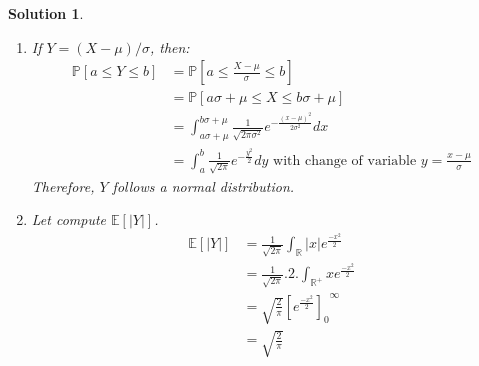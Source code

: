\documentclass{article}
\newcommand{\proba}[1]{\mathbb{P}[#1]}
\newcommand{\esperance}[1]{\mathbb{E}[#1]}
\newcommand{\R}{\mathbb{R}}
\newtheorem{solution}{Solution}
\begin{document}
\begin{solution}
  \begin{enumerate}
    \item If $Y=(X-\mu)/\sigma$, then:
          \begin{align*}
            \proba{a \leq Y \leq b} & = \proba{a \leq \frac{X-\mu}{\sigma} \leq b}                                                                     \\
                                    & = \proba{a\sigma + \mu \leq X \leq b\sigma + \mu}                                                                \\
                                    & = \int_{a\sigma + \mu}^{b\sigma + \mu} \frac{1}{\sqrt{2\pi \sigma^2}} e^{-\frac{{(x-\mu)}^2}{2\sigma^2}} dx      \\
                                    & = \int_a^b \frac{1}{\sqrt{2\pi}} e^{-\frac{y^2}{2}} dy \text{ with change of variable } y = \frac{x-\mu}{\sigma}
          \end{align*}
          Therefore, $Y$ follows a normal distribution.
    \item Let compute $\esperance{|Y|}$.
          \begin{align*}
            \esperance{|Y|} & = \frac{1}{\sqrt{2\pi}} \int_\R |x| e^{\frac{-x^2}{2}}                \\
                            & = \frac{1}{\sqrt{2\pi}}.2. \int_{\R^+} x e^{\frac{-x^2}{2}}           \\
                            & = \sqrt{\frac{2}{\pi}} {{\left[ e^{\frac{-x^2}{2}} \right]}_0}^\infty \\
                            & = \sqrt{\frac{2}{\pi}}
          \end{align*}
  \end{enumerate}
\end{solution}
\end{document}
